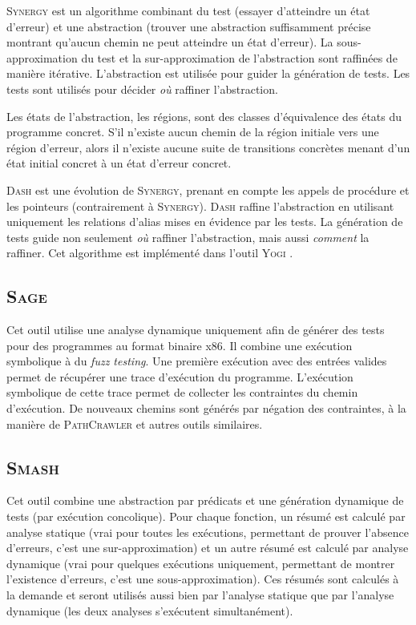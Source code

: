 \documentclass[french]{spimufcphdthesis}
\begin{document}
\textsc{Synergy} \cite{SYNERGY} est un algorithme combinant du test (essayer
d'atteindre un état d'erreur) et une abstraction (trouver une abstraction
suffisamment précise montrant qu'aucun chemin ne peut atteindre un état
d'erreur). La sous-approximation du test et la sur-approximation de
l'abstraction sont raffinées de manière itérative. L'abstraction est utilisée
pour guider la génération de tests. Les tests sont utilisés pour décider
{\em où} raffiner l'abstraction.

Les états de l'abstraction, les régions, sont des classes d'équivalence des
états du programme concret. S'il n'existe aucun chemin de la région initiale
vers une région d'erreur, alors il n'existe aucune suite de transitions
concrètes menant d'un état initial concret à un état d'erreur concret.

\textsc{Dash} \cite{DASH} est une évolution de \textsc{Synergy}, prenant en
compte les appels de procédure et les pointeurs (contrairement à
\textsc{Synergy}). \textsc{Dash} raffine l'abstraction en utilisant uniquement
les relations d'alias mises en évidence par les tests. La génération de tests
guide non seulement {\em où} raffiner l'abstraction, mais aussi {\em comment}
la raffiner. Cet algorithme est implémenté dans l'outil \textsc{Yogi}
\cite{YOGI}.

\subsection{\textsc{Sage}}

Cet outil \cite{SAGE} utilise une analyse dynamique uniquement afin de générer
des tests pour des programmes au format binaire x86. Il combine une exécution
symbolique à du {\em fuzz testing}. Une première exécution avec des entrées
valides permet de récupérer une trace d'exécution du programme. L'exécution
symbolique de cette trace permet de collecter les contraintes du chemin
d'exécution. De nouveaux chemins sont générés par négation des contraintes,
à la manière de \textsc{PathCrawler} \cite{PathCrawler} et autres outils
similaires.

\subsection{\textsc{Smash}}

Cet outil \cite{SMASH} combine une abstraction par prédicats et une génération
dynamique de tests (par exécution concolique). Pour chaque fonction, un résumé
est calculé par analyse statique (vrai pour toutes les exécutions, permettant
de prouver l'absence d'erreurs, c'est une sur-approximation) et un autre résumé
est calculé par analyse dynamique (vrai pour quelques exécutions uniquement,
permettant de montrer l'existence d'erreurs, c'est une sous-approximation). Ces
résumés sont calculés à la demande et seront utilisés aussi bien par l'analyse
statique que par l'analyse dynamique (les deux analyses s'exécutent
simultanément).
\end{document}
